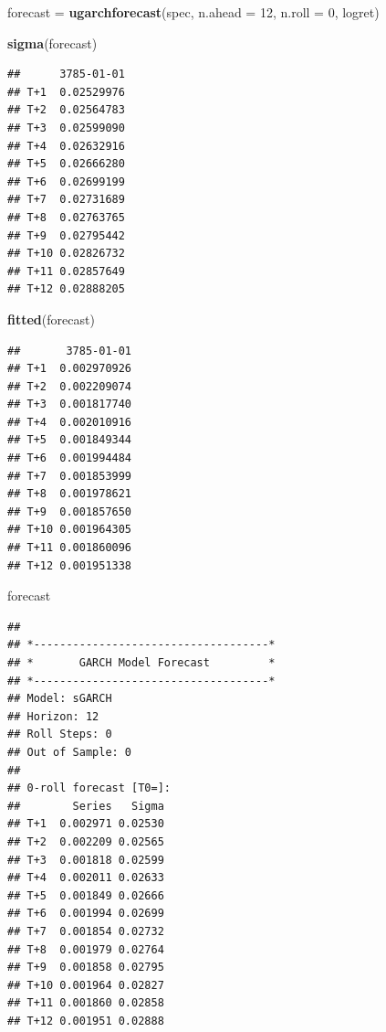 \documentclass[
]{book}
\newenvironment{Shaded}{\begin{snugshade}}{\end{snugshade}}
\newcommand{\AttributeTok}[1]{\textcolor[rgb]{0.13,0.29,0.53}{#1}}
\newcommand{\DecValTok}[1]{\textcolor[rgb]{0.00,0.00,0.81}{#1}}
\newcommand{\FunctionTok}[1]{\textcolor[rgb]{0.13,0.29,0.53}{\textbf{#1}}}
\newcommand{\NormalTok}[1]{#1}
\newcommand{\OtherTok}[1]{\textcolor[rgb]{0.56,0.35,0.01}{#1}}
\begin{document}
\begin{Shaded}
\begin{Highlighting}[]
\NormalTok{forecast }\OtherTok{=} \FunctionTok{ugarchforecast}\NormalTok{(spec, }\AttributeTok{n.ahead =} \DecValTok{12}\NormalTok{, }\AttributeTok{n.roll =} \DecValTok{0}\NormalTok{, logret)}

\FunctionTok{sigma}\NormalTok{(forecast)}
\end{Highlighting}
\end{Shaded}

\begin{verbatim}
##      3785-01-01
## T+1  0.02529976
## T+2  0.02564783
## T+3  0.02599090
## T+4  0.02632916
## T+5  0.02666280
## T+6  0.02699199
## T+7  0.02731689
## T+8  0.02763765
## T+9  0.02795442
## T+10 0.02826732
## T+11 0.02857649
## T+12 0.02888205
\end{verbatim}

\begin{Shaded}
\begin{Highlighting}[]
\FunctionTok{fitted}\NormalTok{(forecast)}
\end{Highlighting}
\end{Shaded}

\begin{verbatim}
##       3785-01-01
## T+1  0.002970926
## T+2  0.002209074
## T+3  0.001817740
## T+4  0.002010916
## T+5  0.001849344
## T+6  0.001994484
## T+7  0.001853999
## T+8  0.001978621
## T+9  0.001857650
## T+10 0.001964305
## T+11 0.001860096
## T+12 0.001951338
\end{verbatim}

\begin{Shaded}
\begin{Highlighting}[]
\NormalTok{forecast}
\end{Highlighting}
\end{Shaded}

\begin{verbatim}
## 
## *------------------------------------*
## *       GARCH Model Forecast         *
## *------------------------------------*
## Model: sGARCH
## Horizon: 12
## Roll Steps: 0
## Out of Sample: 0
## 
## 0-roll forecast [T0=]:
##        Series   Sigma
## T+1  0.002971 0.02530
## T+2  0.002209 0.02565
## T+3  0.001818 0.02599
## T+4  0.002011 0.02633
## T+5  0.001849 0.02666
## T+6  0.001994 0.02699
## T+7  0.001854 0.02732
## T+8  0.001979 0.02764
## T+9  0.001858 0.02795
## T+10 0.001964 0.02827
## T+11 0.001860 0.02858
## T+12 0.001951 0.02888
\end{verbatim}
\end{document}
